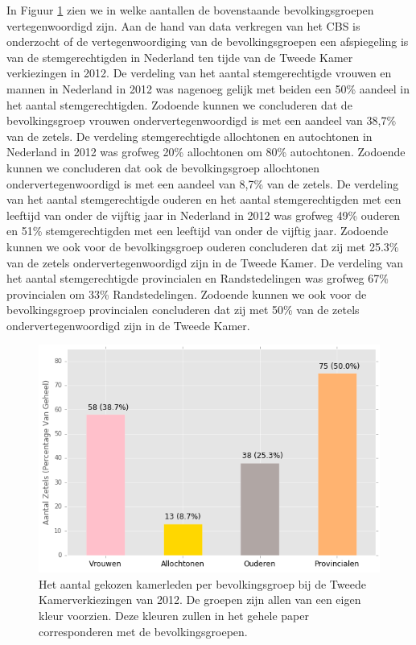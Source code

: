 In Figuur \ref{fig:az2012} zien we in welke aantallen de bovenstaande bevolkingsgroepen vertegenwoordigd zijn. Aan de hand van data verkregen van het CBS \citeyearpar{CBS_stemgedrag} is onderzocht of de vertegenwoordiging van de bevolkingsgroepen een afspiegeling is van de stemgerechtigden in Nederland ten tijde van de Tweede Kamer verkiezingen in 2012.
De verdeling van het aantal stemgerechtigde vrouwen en mannen in Nederland in 2012 was nagenoeg gelijk met beiden een 50\% aandeel in het aantal stemgerechtigden. Zodoende kunnen we concluderen dat de bevolkingsgroep vrouwen ondervertegenwoordigd is met een aandeel van 38,7\% van de zetels. 
De verdeling stemgerechtigde allochtonen en autochtonen in Nederland in 2012 was grofweg 20\% allochtonen om 80\% autochtonen. Zodoende kunnen we concluderen dat ook de bevolkingsgroep allochtonen ondervertegenwoordigd is met een aandeel van 8,7\% van de zetels. 
De verdeling van het aantal stemgerechtigde ouderen en het aantal stemgerechtigden met een leeftijd van onder de vijftig jaar in Nederland in 2012 was grofweg 49\% ouderen en 51\% stemgerechtigden met een leeftijd van onder de vijftig jaar. Zodoende kunnen we ook voor de bevolkingsgroep ouderen concluderen dat zij met 25.3\% van de zetels ondervertegenwoordigd zijn in de Tweede Kamer. 
De verdeling van het aantal stemgerechtigde provincialen en Randstedelingen was grofweg 67\% provincialen om 33\% Randstedelingen. Zodoende kunnen we ook voor de bevolkingsgroep provincialen concluderen dat zij met 50\% van de zetels ondervertegenwoordigd zijn in de Tweede Kamer. 

\begin{figure}[H]
\centering

	\includegraphics[width=0.55\linewidth]{aantal_zetels_bevolkingsgroepen.png}

			\caption{Het aantal gekozen kamerleden per bevolkingsgroep bij de Tweede Kamerverkiezingen van 2012. De groepen zijn allen van een eigen kleur voorzien. Deze kleuren zullen in het gehele paper corresponderen met de bevolkingsgroepen.}

\label{fig:az2012}
\end{figure}

